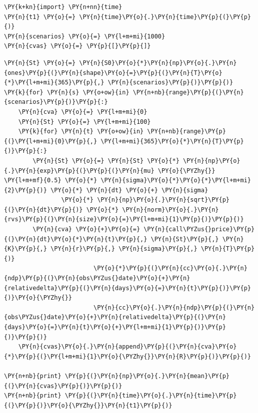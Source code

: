 \begin{Answer}
\begin{codebox}[size=fbox, boxrule=1pt, colback=cellbackground, colframe=cellborder]
\begin{Verbatim}[commandchars=\\\{\}]
\PY{k+kn}{import} \PY{n+nn}{time}
\PY{n}{t1} \PY{o}{=} \PY{n}{time}\PY{o}{.}\PY{n}{time}\PY{p}{(}\PY{p}{)}
\PY{n}{scenarios} \PY{o}{=} \PY{l+m+mi}{1000}
\PY{n}{cvas} \PY{o}{=} \PY{p}{[}\PY{p}{]}
\end{Verbatim}
\end{codebox}

\begin{codebox}[size=fbox, boxrule=1pt, colback=cellbackground, colframe=cellborder]
\begin{Verbatim}[commandchars=\\\{\}]
\PY{n}{St} \PY{o}{=} \PY{n}{S0}\PY{o}{*}\PY{n}{np}\PY{o}{.}\PY{n}{ones}\PY{p}{(}\PY{n}{shape}\PY{o}{=}\PY{p}{(}\PY{n}{T}\PY{o}{*}\PY{l+m+mi}{365}\PY{p}{,} \PY{n}{scenarios}\PY{p}{)}\PY{p}{)}    
\PY{k}{for} \PY{n}{s} \PY{o+ow}{in} \PY{n+nb}{range}\PY{p}{(}\PY{n}{scenarios}\PY{p}{)}\PY{p}{:}
    \PY{n}{cva} \PY{o}{=} \PY{l+m+mi}{0}
    \PY{n}{St} \PY{o}{=} \PY{l+m+mi}{100}
    \PY{k}{for} \PY{n}{t} \PY{o+ow}{in} \PY{n+nb}{range}\PY{p}{(}\PY{l+m+mi}{0}\PY{p}{,} \PY{l+m+mi}{365}\PY{o}{*}\PY{n}{T}\PY{p}{)}\PY{p}{:} 
        \PY{n}{St} \PY{o}{=} \PY{n}{St} \PY{o}{*} \PY{n}{np}\PY{o}{.}\PY{n}{exp}\PY{p}{(}\PY{p}{(}\PY{n}{mu} \PY{o}{\PYZhy{}} \PY{l+m+mf}{0.5} \PY{o}{*} \PY{n}{sigma}\PY{o}{*}\PY{o}{*}\PY{l+m+mi}{2}\PY{p}{)} \PY{o}{*} \PY{n}{dt} \PY{o}{+} \PY{n}{sigma} 
                \PY{o}{*} \PY{n}{np}\PY{o}{.}\PY{n}{sqrt}\PY{p}{(}\PY{n}{dt}\PY{p}{)} \PY{o}{*} \PY{n}{norm}\PY{o}{.}\PY{n}{rvs}\PY{p}{(}\PY{n}{size}\PY{o}{=}\PY{l+m+mi}{1}\PY{p}{)}\PY{p}{)}
        \PY{n}{cva} \PY{o}{+}\PY{o}{=} \PY{n}{call\PYZus{}price}\PY{p}{(}\PY{n}{dt}\PY{o}{*}\PY{n}{t}\PY{p}{,} \PY{n}{St}\PY{p}{,} \PY{n}{K}\PY{p}{,} \PY{n}{r}\PY{p}{,} \PY{n}{sigma}\PY{p}{,} \PY{n}{T}\PY{p}{)}
                         \PY{o}{*}\PY{p}{(}\PY{n}{cc}\PY{o}{.}\PY{n}{ndp}\PY{p}{(}\PY{n}{obs\PYZus{}date}\PY{o}{+}\PY{n}{relativedelta}\PY{p}{(}\PY{n}{days}\PY{o}{=}\PY{n}{t}\PY{p}{)}\PY{p}{)}\PY{o}{\PYZhy{}}
                         \PY{n}{cc}\PY{o}{.}\PY{n}{ndp}\PY{p}{(}\PY{n}{obs\PYZus{}date}\PY{o}{+}\PY{n}{relativedelta}\PY{p}{(}\PY{n}{days}\PY{o}{=}\PY{n}{t}\PY{o}{+}\PY{l+m+mi}{1}\PY{p}{)}\PY{p}{)}\PY{p}{)}        
    \PY{n}{cvas}\PY{o}{.}\PY{n}{append}\PY{p}{(}\PY{n}{cva}\PY{o}{*}\PY{p}{(}\PY{l+m+mi}{1}\PY{o}{\PYZhy{}}\PY{n}{R}\PY{p}{)}\PY{p}{)}
		
\PY{n+nb}{print} \PY{p}{(}\PY{n}{np}\PY{o}{.}\PY{n}{mean}\PY{p}{(}\PY{n}{cvas}\PY{p}{)}\PY{p}{)}
\PY{n+nb}{print} \PY{p}{(}\PY{n}{time}\PY{o}{.}\PY{n}{time}\PY{p}{(}\PY{p}{)}\PY{o}{\PYZhy{}}\PY{n}{t1}\PY{p}{)}
\end{Verbatim}
\end{codebox}


\end{Answer}
